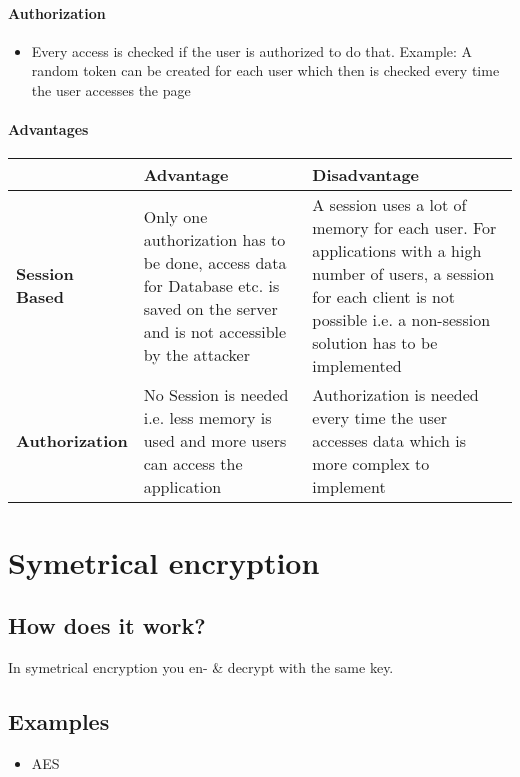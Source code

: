 \documentclass[11pt,twoside,a4paper]{article}
\begin{document}
        \paragraph{Authorization}
        \begin{itemize}
        	\item Every access is checked if the user is authorized to do that. Example: A random token can be created for each user which then is checked every time the user accesses the page
        \end{itemize}

		\paragraph{Advantages}
		
		\begin{tabular}{|l|p{4cm}|p{4cm}|}
			\hline
			& \textbf{Advantage} & \textbf{Disadvantage} \\\hline
			\textbf{Session Based} & Only one authorization has to be done, access data for Database etc. is saved on the server and is not accessible by the attacker & A session uses a lot of memory for each user. For applications with a high number of users, a session for each client is not possible i.e. a non-session solution has to be implemented \\\hline
			\textbf{Authorization} & No Session is needed i.e. less memory is used and more users can access the application & Authorization is needed every time the user accesses data which is more complex to implement\\\hline
		\end{tabular}
		
		\section{Symetrical encryption}
		\subsection{How does it work?}
		
		In symetrical encryption you en- \& decrypt with the same key. 
		
		\subsection{Examples}
		
		\begin{itemize}
			\item AES
		\end{itemize}
		
\end{document}

